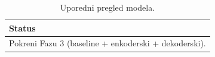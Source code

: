 \begin{table}[H]\centering
\caption{Uporedni pregled modela.}\label{tab:poredjenje}
\begin{tabular}{l}
\toprule
Status \\
\midrule
Pokreni Fazu 3 (baseline + enkoderski + dekoderski). \\
\bottomrule
\end{tabular}
\end{table}
